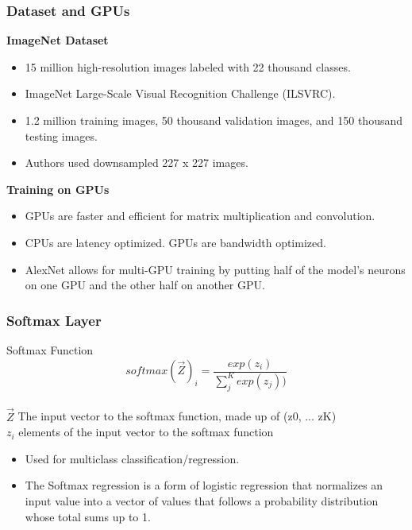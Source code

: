 \documentclass[aspectratio=169, 10pt]{beamer}
\begin{document}
\begin{frame}
	\frametitle{Dataset and GPUs}
	\textbf{ImageNet Dataset}
		\begin{itemize}
			\item 15 million high-resolution images labeled with 22 thousand classes.
			\item ImageNet Large-Scale Visual Recognition Challenge (ILSVRC).
			\item 1.2 million training images, 50 thousand validation images, and 150 thousand testing images.
			\item Authors used downsampled 227 x 227 images.
		\end{itemize}
	
	\vspace{8pt}
	\textbf{Training on GPUs}
		\begin{itemize}
			\item GPUs are faster and efficient for matrix multiplication and convolution.
			\item CPUs are latency optimized. GPUs are bandwidth optimized.
			\item AlexNet allows for multi-GPU training by putting half of the model’s neurons on one GPU and the other half on another GPU.
		\end{itemize}

\end{frame}

\begin{frame}
	\frametitle{Softmax Layer}
	
	\begin{block}{Softmax Function}
		\[ softmax(\overrightarrow{Z})_i = \frac{exp(z_i)}{\sum_{j}^{K}exp(z_j))}\]
		\vspace{10pt}\\
		$\overrightarrow{Z}$ The input vector to the softmax function, made up of (z0, ... zK)\\
		$z_i$  elements of the input vector to the softmax function
	\end{block}
	
	\begin{itemize}
		\item Used for multiclass classification/regression.
		\item The Softmax regression is a form of logistic regression that normalizes an input value into a vector of values that follows a probability distribution whose total sums up to 1.
		
	\end{itemize}

\end{frame}
\end{document}
